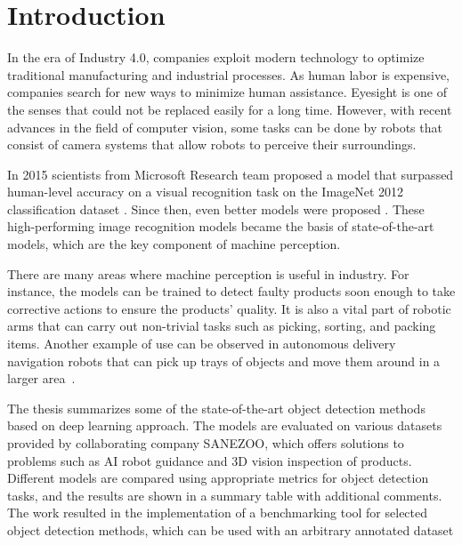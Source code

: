 \chapter{Introduction}

In the era of Industry 4.0, companies exploit modern technology to optimize traditional manufacturing and industrial processes. As human labor is expensive, companies search for new ways to minimize human assistance. Eyesight is one of the senses that could not be replaced easily for a long time. However, with recent advances in the field of computer vision, some tasks can be done by robots that consist of camera systems that allow robots to perceive their surroundings. 

In 2015 scientists from Microsoft Research team proposed a  model that surpassed human-level accuracy on a visual recognition task on the ImageNet 2012 classification dataset \cite{surp2015}. Since then, even better models were proposed \cite{resnet, efficientnet}. These high-performing image recognition models became the basis of state-of-the-art  models, which are the key component of machine perception.

There are many areas where machine perception is useful in industry. For instance, the models can be trained to detect faulty products soon enough to take corrective actions to ensure the products' quality. It is also a vital part of robotic arms that can carry out non-trivial tasks such as picking, sorting, and packing items. Another example of use can be observed in autonomous delivery navigation robots that can pick up trays of objects and move them around in a larger area~\cite{bmw}. 

The thesis summarizes some of the state-of-the-art object detection methods based on deep learning approach. The models are evaluated on various datasets provided by collaborating company SANEZOO, which offers solutions to problems such as AI robot guidance and 3D vision inspection of products. Different models are compared using appropriate metrics for object detection tasks, and the results are shown in a summary table with additional comments. The work resulted in the implementation of a benchmarking tool for selected object detection methods, which can be used with an arbitrary annotated dataset

